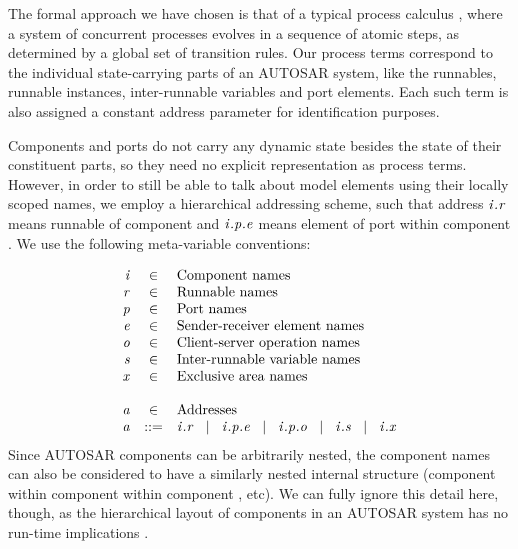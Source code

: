 \documentclass[twocolumn]{article}
\begin{document}
The formal approach we have chosen is that of a typical process calculus \cite{TODO}, where a system of concurrent processes evolves in a sequence of atomic steps, as determined by a global set of transition rules. Our process terms correspond to the individual state-carrying parts of an AUTOSAR system, like the runnables, runnable instances, inter-runnable variables and port elements. Each such term is also assigned a constant address parameter for identification purposes.

Components and ports do not carry any dynamic state besides the state of their constituent parts, so they need no explicit representation as process terms. However, in order to still be able to talk about model elements using their locally scoped names, we employ a hierarchical addressing scheme, such that address $\Tr{\V{R}}{\V{I}}$ means runnable  of component  and $\Tep{\V{E}}{\V{P}}{\V{I}}$ means element  of port  within component . We use the following meta-variable conventions:

%
\[
\begin{array}{rcll}
  \V{I} & \in & \text{Component names} \\
  \V{R} & \in & \text{Runnable names} \\
  \V{P} & \in & \text{Port names} \\
  \V{E} & \in & \text{Sender-receiver element names} \\
  \V{O} & \in & \text{Client-server operation names} \\
  \V{S} & \in & \text{Inter-runnable variable names} \\
  \V{X} & \in & \text{Exclusive area names} \\
\\
  \V{A} & \in & \text{Addresses} \\
  \V{A} & ::= & \Tr{\V{R}}{\V{I}}   \sep   \Tep{\V{E}}{\V{P}}{\V{I}}   \sep \Top{\V{O}}{\V{P}}{\V{I}}   \sep   \Ts{\V{S}}{\V{I}}   \sep   \Tx{\V{X}}{\V{I}}   \\
\end{array}
\]
%
Since AUTOSAR components can be arbitrarily nested, the component names  can also be considered to have a similarly nested internal structure (component  within component  within component , etc). We can fully ignore this detail here, though, as the hierarchical layout of components in an AUTOSAR system has no run-time implications \cite{TODO2}.
\end{document}
